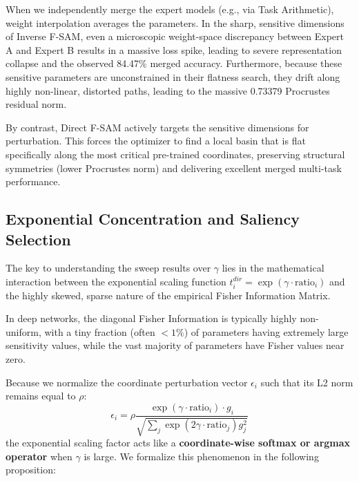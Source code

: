 \documentclass{article}
\theoremstyle{plain}
\theoremstyle{definition}
\theoremstyle{remark}
\begin{document}
When we independently merge the expert models (e.g., via Task Arithmetic), weight interpolation averages the parameters. In the sharp, sensitive dimensions of Inverse F-SAM, even a microscopic weight-space discrepancy between Expert A and Expert B results in a massive loss spike, leading to severe representation collapse and the observed 84.47\% merged accuracy. Furthermore, because these sensitive parameters are unconstrained in their flatness search, they drift along highly non-linear, distorted paths, leading to the massive 0.73379 Procrustes residual norm.

By contrast, Direct F-SAM actively targets the sensitive dimensions for perturbation. This forces the optimizer to find a local basin that is flat specifically along the most critical pre-trained coordinates, preserving structural symmetries (lower Procrustes norm) and delivering excellent merged multi-task performance.

\subsection{Exponential Concentration and Saliency Selection}
The key to understanding the sweep results over $\gamma$ lies in the mathematical interaction between the exponential scaling function $t_i^{dir} = \exp(\gamma \cdot \text{ratio}_i)$ and the highly skewed, sparse nature of the empirical Fisher Information Matrix.

In deep networks, the diagonal Fisher Information is typically highly non-uniform, with a tiny fraction (often $< 1\%$) of parameters having extremely large sensitivity values, while the vast majority of parameters have Fisher values near zero. 

Because we normalize the coordinate perturbation vector $\epsilon_i$ such that its L2 norm remains equal to $\rho$:
\begin{equation}
    \epsilon_i = \rho \frac{\exp(\gamma \cdot \text{ratio}_i) \cdot g_i}{\sqrt{\sum_j \exp(2\gamma \cdot \text{ratio}_j) g_j^2}}
\end{equation}
the exponential scaling factor acts like a \textbf{coordinate-wise softmax or argmax operator} when $\gamma$ is large. We formalize this phenomenon in the following proposition:
\end{document}
